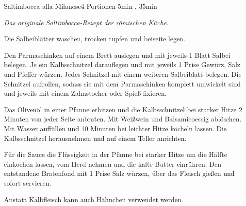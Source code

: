 \documentclass[../recipe-collections/cooking.tex]{subfiles}
\begin{document}
\begin{recipe}{Saltimbocca alla Milanese}{4 Portionen }{5min , 35min }

  \freeform{}\textit{Das originale Saltimbocca-Rezept der römischen Küche.}


  Die Salbeiblätter waschen, trocken tupfen und beiseite legen.


  Den Parmaschinken auf einem Brett auslegen und mit jeweils 1 Blatt Salbei belegen.
  Je ein Kalbsschnitzel darauflegen und mit jeweils 1 Prise Gewürz, Salz und Pfeffer würzen.
  Jedes Schnitzel mit einem weiteren Salbeiblatt belegen.
  Die Schnitzel aufrollen, sodass sie mit dem Parmaschinken komplett umwickelt sind und jeweils mit einem Zahnstocher oder Spieß fixieren.


  Das Olivenöl in einer Pfanne erhitzen und die Kalbsschnitzel bei starker Hitze 2 Minuten von jeder Seite anbraten.
  Mit Weißwein und Balsamicoessig ablöschen.
  Mit Wasser auffüllen und 10 Minuten bei leichter Hitze köcheln lassen.
  Die Kalbsschnitzel herausnehmen und auf einem Teller anrichten.


  Für die Sauce die Flüssigkeit in der Pfanne bei starker Hitze um die Hälfte einkochen lassen, vom Herd nehmen und die kalte Butter einrühren.
  Den entstandene Bratenfond mit 1 Prise Salz würzen, über das Fleisch gießen und sofort servieren.

  \freeform{}\hrulefill{}

  \freeform{}
  Anstatt Kalbfleisch kann auch Hähnchen verwendet werden.

\end{recipe}
\end{document}

